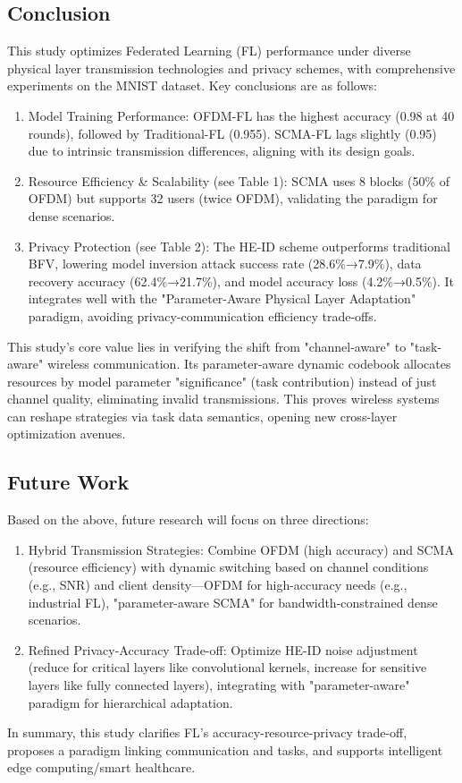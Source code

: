 \documentclass[runningheads]{llncs}
\begin{document}
\subsection{Conclusion}
This study optimizes Federated Learning (FL) performance under diverse physical layer transmission technologies and privacy schemes, with comprehensive experiments on the MNIST dataset. Key conclusions are as follows:
\begin{enumerate}
\item Model Training Performance: OFDM-FL has the highest accuracy (0.98 at 40 rounds), followed by Traditional-FL (0.955). SCMA-FL lags slightly (0.95) due to intrinsic transmission differences, aligning with its design goals.
\item Resource Efficiency \& Scalability (see Table 1): SCMA uses 8 blocks (50\% of OFDM) but supports 32 users (twice OFDM), validating the paradigm for dense scenarios.

\item Privacy Protection (see Table 2): The HE-ID scheme outperforms traditional BFV, lowering model inversion attack success rate (28.6\%→7.9\%), data recovery accuracy (62.4\%→21.7\%), and model accuracy loss (4.2\%→0.5\%). It integrates well with the "Parameter-Aware Physical Layer Adaptation" paradigm, avoiding privacy-communication efficiency trade-offs.
\end{enumerate}
This study’s core value lies in verifying the shift from "channel-aware" to "task-aware" wireless communication. Its parameter-aware dynamic codebook allocates resources by model parameter "significance" (task contribution) instead of just channel quality, eliminating invalid transmissions. This proves wireless systems can reshape strategies via task data semantics, opening new cross-layer optimization avenues.
\subsection{Future Work}
Based on the above, future research will focus on three directions:
\begin{enumerate}
\item Hybrid Transmission Strategies: Combine OFDM (high accuracy) and SCMA (resource efficiency) with dynamic switching based on channel conditions (e.g., SNR) and client density—OFDM for high-accuracy needs (e.g., industrial FL), "parameter-aware SCMA" for bandwidth-constrained dense scenarios.
\item Refined Privacy-Accuracy Trade-off: Optimize HE-ID noise adjustment (reduce for critical layers like convolutional kernels, increase for sensitive layers like fully connected layers), integrating with "parameter-aware" paradigm for hierarchical adaptation.
\end{enumerate}
In summary, this study clarifies FL's accuracy-resource-privacy trade-off, proposes a paradigm linking communication and tasks, and supports intelligent edge computing/smart healthcare.


\end{document}
